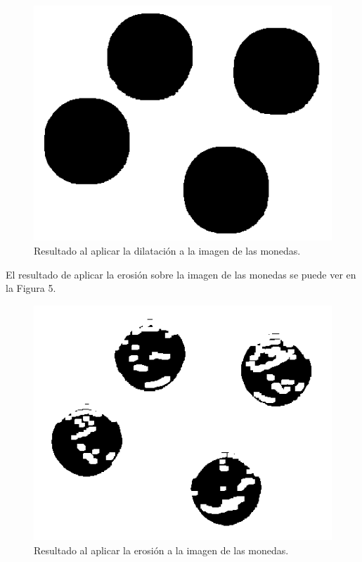 \documentclass[conference]{IEEEtran}
\begin{document}
\begin{figure}[h]
	\begin{center}
		\setlength{\unitlength}{0.00105in}
		\includegraphics[scale=0.30]{./images/coins_out.png}
	\end{center}
	\caption{Resultado al aplicar la dilataci\'on a la imagen de las monedas.}
\end{figure}

El resultado de aplicar la erosi\'on sobre la imagen de las monedas se puede ver en la Figura 5.
\begin{figure}[h]
	\begin{center}
		\setlength{\unitlength}{0.00105in}
		\includegraphics[scale=0.30]{./images/erosion_out.png}
	\end{center}
	\caption{Resultado al aplicar la erosi\'on a la imagen de las monedas.}
\end{figure}
\end{document}
